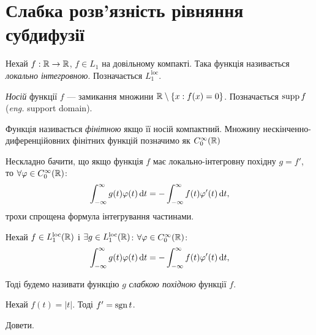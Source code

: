 
\section{Слабка розв'язність рівняння субдифузії}

\begin{definition}
    Нехай $f: \mathbb{R} \to \mathbb{R}$, $f \in L_1$ на довільному компакті.
    Така функція називається \textit{локально інтегровною}.
    Позначається $L_1^{\text{loc}}$.
\end{definition}

\begin{definition}
    \textit{Носій} функції $f$ --- замикання множини $\mathbb{R} \setminus \{ x : f(x) = 0 \}$.
    Позначається $\operatorname{supp} f$ (\textit{eng.} support domain).
\end{definition}

\begin{definition}
    Функція називається \textit{фінітною} якщо її носій компактний.
    Множину нескінченно-диференційовних фінітних функцій позначимо як $C_0^\infty(\mathbb{R})$
\end{definition}

Нескладно бачити, що якщо функція $f$ має локально-інтегровну похідну $g = f'$, то $\forall \varphi \in C_0^\infty(\mathbb{R})$:
\begin{equation}
    \int_{-\infty}^\infty g(t) \varphi(t) \mathop{}\!\mathrm{d} t = -\int_{-\infty}^{\infty} f(t) \varphi'(t) \mathop{}\!\mathrm{d} t,
\end{equation}
трохи спрощена формула інтегрування частинами.

\begin{definition}
    Нехай $f \in L_1^{\text{loc}}(\mathbb{R})$ і $\exists g \in L_1^{\text{loc}}(\mathbb{R})$: $\forall \varphi \in C_0^\infty(\mathbb{R})$:
    \begin{equation}
        \int_{-\infty}^\infty g(t) \varphi(t) \mathop{}\!\mathrm{d} t = -\int_{-\infty}^{\infty} f(t) \varphi'(t) \mathop{}\!\mathrm{d} t,
    \end{equation}

    Тоді будемо називати функцію $g$ \textit{слабкою похідною} функції $f$.
\end{definition}

\begin{example}
    Нехай $f(t) = |t|$. Тоді $f' = \operatorname{sgn} t$.
\end{example}

\begin{exercise}
    Довети.
\end{exercise}

